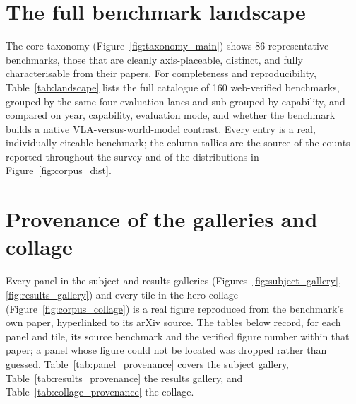 \section{The full benchmark landscape}
\label{app:landscape}

The core taxonomy (Figure~\ref{fig:taxonomy_main}) shows 86 representative benchmarks, those that are
cleanly axis-placeable, distinct, and fully characterisable from their papers. For completeness and
reproducibility, Table~\ref{tab:landscape} lists the full catalogue of 160 web-verified benchmarks,
grouped by the same four evaluation lanes and sub-grouped by capability, and compared on year,
capability, evaluation mode, and whether the benchmark builds a native VLA-versus-world-model
contrast. Every entry is a real, individually citeable benchmark; the column tallies are the source
of the counts reported throughout the survey and of the distributions in
Figure~\ref{fig:corpus_dist}.



\section{Provenance of the galleries and collage}
\label{app:provenance}

Every panel in the subject and results galleries (Figures~\ref{fig:subject_gallery},
\ref{fig:results_gallery}) and every tile in the hero collage (Figure~\ref{fig:corpus_collage}) is a
real figure reproduced from the benchmark's own paper, hyperlinked to its arXiv source. The tables
below record, for each panel and tile, its source benchmark and the verified figure number within
that paper; a panel whose figure could not be located was dropped rather than guessed.
Table~\ref{tab:panel_provenance} covers the subject gallery, Table~\ref{tab:results_provenance} the
results gallery, and Table~\ref{tab:collage_provenance} the collage.




